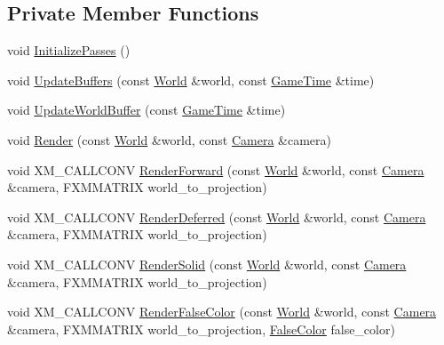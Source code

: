 \subsection*{Private Member Functions}
\begin{DoxyCompactItemize}
\item 
void \mbox{\hyperlink{classmage_1_1rendering_1_1_renderer_1_1_impl_a0db15a325a2e2242a76323b27acec12f}{Initialize\+Passes}} ()
\item 
void \mbox{\hyperlink{classmage_1_1rendering_1_1_renderer_1_1_impl_acbf6274f82a95beac2543c8e642c309c}{Update\+Buffers}} (const \mbox{\hyperlink{classmage_1_1rendering_1_1_world}{World}} \&world, const \mbox{\hyperlink{classmage_1_1_game_time}{Game\+Time}} \&time)
\item 
void \mbox{\hyperlink{classmage_1_1rendering_1_1_renderer_1_1_impl_abe65d2d48affa6a7c83104944b4737d7}{Update\+World\+Buffer}} (const \mbox{\hyperlink{classmage_1_1_game_time}{Game\+Time}} \&time)
\item 
void \mbox{\hyperlink{classmage_1_1rendering_1_1_renderer_1_1_impl_af2d46a795175867592dc70e63c93967b}{Render}} (const \mbox{\hyperlink{classmage_1_1rendering_1_1_world}{World}} \&world, const \mbox{\hyperlink{classmage_1_1rendering_1_1_camera}{Camera}} \&camera)
\item 
void X\+M\+\_\+\+C\+A\+L\+L\+C\+O\+NV \mbox{\hyperlink{classmage_1_1rendering_1_1_renderer_1_1_impl_a42d47faf6879db3bc00190b9e626eef9}{Render\+Forward}} (const \mbox{\hyperlink{classmage_1_1rendering_1_1_world}{World}} \&world, const \mbox{\hyperlink{classmage_1_1rendering_1_1_camera}{Camera}} \&camera, F\+X\+M\+M\+A\+T\+R\+IX world\+\_\+to\+\_\+projection)
\item 
void X\+M\+\_\+\+C\+A\+L\+L\+C\+O\+NV \mbox{\hyperlink{classmage_1_1rendering_1_1_renderer_1_1_impl_add8f54938b1bd940a032e5165c60a09a}{Render\+Deferred}} (const \mbox{\hyperlink{classmage_1_1rendering_1_1_world}{World}} \&world, const \mbox{\hyperlink{classmage_1_1rendering_1_1_camera}{Camera}} \&camera, F\+X\+M\+M\+A\+T\+R\+IX world\+\_\+to\+\_\+projection)
\item 
void X\+M\+\_\+\+C\+A\+L\+L\+C\+O\+NV \mbox{\hyperlink{classmage_1_1rendering_1_1_renderer_1_1_impl_a39a9a77669ce1c2615f61806dd4f06e3}{Render\+Solid}} (const \mbox{\hyperlink{classmage_1_1rendering_1_1_world}{World}} \&world, const \mbox{\hyperlink{classmage_1_1rendering_1_1_camera}{Camera}} \&camera, F\+X\+M\+M\+A\+T\+R\+IX world\+\_\+to\+\_\+projection)
\item 
void X\+M\+\_\+\+C\+A\+L\+L\+C\+O\+NV \mbox{\hyperlink{classmage_1_1rendering_1_1_renderer_1_1_impl_aecb98e030f5486bbd31384af5b6e77b0}{Render\+False\+Color}} (const \mbox{\hyperlink{classmage_1_1rendering_1_1_world}{World}} \&world, const \mbox{\hyperlink{classmage_1_1rendering_1_1_camera}{Camera}} \&camera, F\+X\+M\+M\+A\+T\+R\+IX world\+\_\+to\+\_\+projection, \mbox{\hyperlink{namespacemage_1_1rendering_a6c3d1f4e7a5ae72dc07226e971205534}{False\+Color}} false\+\_\+color)

\end{DoxyCompactItemize}
